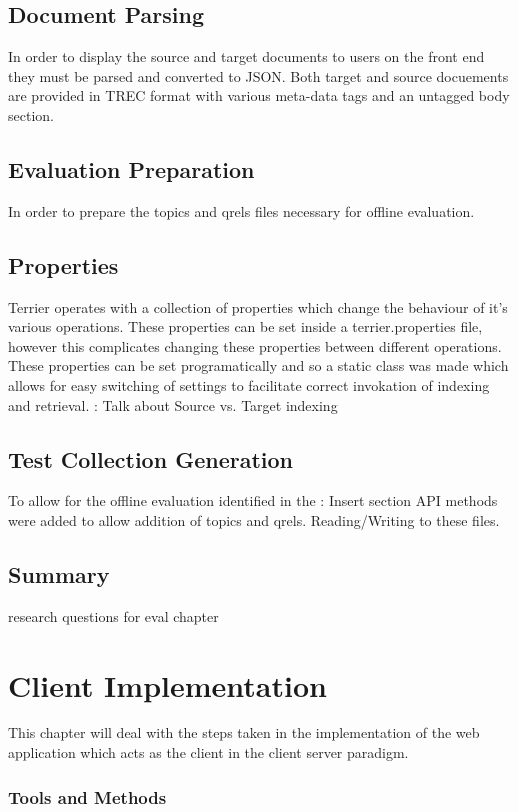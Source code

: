 \documentclass{l4proj}
\begin{document}
\section{Document Parsing}
In order to display the source and target documents to users on the front end they must be parsed and converted to JSON.
Both target and source docuements are provided in TREC format with various meta-data tags and an untagged body section. 

\section{Evaluation Preparation}
In order to prepare the topics and qrels files necessary for offline evaluation. 

\section{Properties}
Terrier operates with a collection of properties which change the behaviour of it's various operations. These properties can be set inside a terrier.properties file, however this complicates changing these properties between different operations. These properties can be set programatically and so a static class was made which allows for easy switching of settings to facilitate correct invokation of indexing and retrieval. : Talk about Source vs. Target indexing

\section{Test Collection Generation}
To allow for the offline evaluation identified in the : Insert section API methods were added to allow addition of topics and qrels.
Reading/Writing to these files.

\section{Summary}
research questions for eval chapter

\chapter{Client Implementation}
This chapter will deal with the steps taken in the implementation of the web application which acts as the client in the client server paradigm.

\subsection{Tools and Methods}
\end{document}
